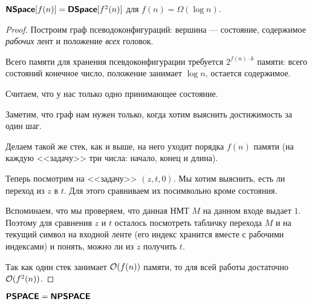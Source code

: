 \begin{thm}
	$ \textmd{\textbf{\textsf{NSpace}}}[f(n)] = \textmd{\textbf{\textsf{DSpace}}}[f^2(n)]$ для $ f(n) = \Omega (\log n)$.
\end{thm}
\begin{proof}
	Построим граф псеводоконфигураций: вершина --- состояние, содержимое \textit{рабочих} лент и положение \textit{всех} головок.

	Всего памяти для хранения псевдоконфигурации требуется  $ 2^{f(n)\cdot k}$ памяти: всего состояний конечное число, положение занимает $ \log n$, остается содержимое.

	Считаем, что у нас только одно принимающее состояние. 

	Заметим, что граф нам нужен только, когда хотим выяснить достижимость за один шаг.

	Делаем такой же стек, как и выше, на него уходит порядка $ f(n)$ памяти (на каждую <<задачу>> три числа: начало, конец и длина).

	Теперь посмотрим на <<задачу>> $ (z, t, 0)$. Мы хотим выяснить, есть ли переход из $ z$ в $ t$. Для этого сравниваем их посимвольно кроме состояния. 

	Вспоминаем, что мы проверяем, что данная НМТ $ M$ на данном входе выдает $ 1$. Поэтому для сравнения $ z$ и $ t$ осталось посмотреть табличку перехода $ M$ и на текущий символ на входной ленте (его индекс хранится вместе с рабочими индексами) и понять, можно ли из $ z$ получить $ t$.  

	Так как один стек занимает $ \mathcal{O}(f(n))$ памяти, то для всей работы достаточно $ \mathcal{O}(f^2(n))$.
\end{proof}
\begin{cor}
    $ \textmd{\textbf{\textsf{PSPACE}}} = \textmd{\textbf{\textsf{NPSPACE}}}$
\end{cor}

